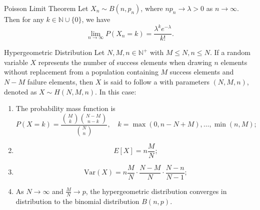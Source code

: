\documentclass[../main.tex]{subfiles}
\begin{document}
\begin{proposition}{Poisson Limit Theorem}{}
Let $X_n \sim B(n,p_n)$, where $np_n \to \lambda > 0$ as $n \to \infty$. Then for any $k \in \mathbb{N} \cup \{0\}$, we have
\[\lim_{n \to \infty} P(X_n = k) = \frac{\lambda^k e^{-\lambda}}{k!}.\]
\end{proposition}

\begin{proposition}{Hypergeometric Distribution}{}
Let $N,M,n \in \mathbb{N}^+$ with $M \leq N, n \leq N$. If a random variable $X$ represents the number of success elements when drawing $n$ elements without replacement from a population containing $M$ success elements and $N-M$ failure elements, then $X$ is said to follow a  with parameters $(N,M,n)$, denoted as $X \sim H(N,M,n)$. In this case:

\begin{enumerate}
\item The probability mass function is 
\[P(X=k) = \frac{\binom{M}{k}\binom{N-M}{n-k}}{\binom{N}{n}}, \quad k=\max(0,n-N+M),\ldots,\min(n,M);\]

\item \[E[X] = n\frac{M}{N};\]

\item \[\text{Var}(X) = n\frac{M}{N}\cdot\frac{N-M}{N}\cdot\frac{N-n}{N-1};\]

\item As $N \to \infty$ and $\frac{M}{N} \to p$, the hypergeometric distribution converges in distribution to the binomial distribution $B(n,p)$.
\end{enumerate}
\end{proposition}
\end{document}
